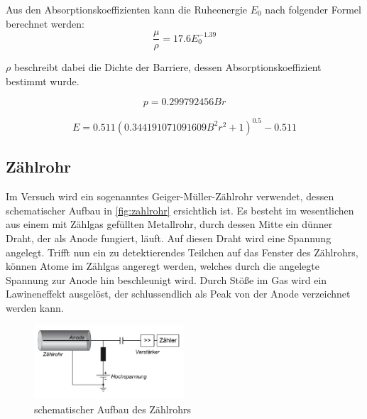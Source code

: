 \documentclass[12pt,english,ngerman]{scrartcl}
\begin{document}
Aus den Absorptionskoeffizienten kann die Ruheenergie \(E_0\) nach folgender
Formel berechnet werden:
\begin{equation}
  \frac{\mu}{\rho} = 17.6 E_0^{-1.39}
  \label{eq:Endpunktsenergie}
\end{equation}

\(\rho\) beschreibt dabei die Dichte der Barriere, dessen
Absorptionskoeffizient bestimmt wurde.\cite[]{}

\begin{equation}
  p = 0.299792456 B r
  \label{eq:lorentzimpuls}
\end{equation}

\begin{equation}
  E = 0.511 \left(0.344191071091609 B^{2} r^{2} + 1\right)^{0.5} - 0.511
  \label{eq:energieimpulsrelation}
\end{equation}

\subsection{Zählrohr}

Im Versuch wird ein sogenanntes Geiger-Müller-Zählrohr verwendet, dessen schematischer Aufbau in \autoref{fig:zahlrohr} ersichtlich ist.
Es besteht im wesentlichen aus einem mit Zählgas gefüllten Metallrohr, durch dessen Mitte ein dünner Draht, der als Anode fungiert,
läuft. Auf diesen Draht wird eine Spannung angelegt. Trifft nun ein zu detektierendes Teilchen auf das Fenster des
Zählrohrs, können Atome im Zählgas angeregt werden, welches durch die angelegte Spannung zur Anode hin beschleunigt
wird. Durch Stöße im Gas wird ein Lawineneffekt ausgelöst, der schlussendlich als Peak von der Anode verzeichnet werden kann.

\begin{figure}[H]
  \begin{center}
  \includegraphics[width = 0.5\textwidth]{./figures/zahlrohr.png}
	
\end{center}
	\caption{schematischer Aufbau des Zählrohrs~\cite[]{}}
	\label{fig:zahlrohr}

\end{figure}
\end{document}
